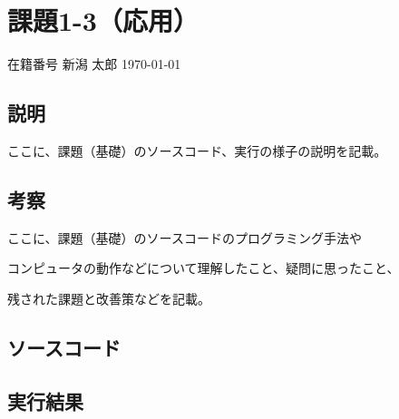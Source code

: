 \documentclass[a4paper,12pt,uplatex]{jsarticle}
\newcommand{\mynumber}{在籍番号} %
\newcommand{\myname}{新潟 太郎} %
\newcommand{\myheader}{ %
\begin{flushright}
\mynumber\hspace{1zw} \myname\hspace{1zw} \today\end{flushright}}
\begin{document}









\newpage

\section*{課題1-3（応用）}

\myheader



\subsection*{説明}



ここに、課題（基礎）のソースコード、実行の様子の説明を記載。



\subsection*{考察}



ここに、課題（基礎）のソースコードのプログラミング手法や

コンピュータの動作などについて理解したこと、疑問に思ったこと、

残された課題と改善策などを記載。



\subsection*{ソースコード}




%



\subsection*{実行結果}





%



\end{document}
